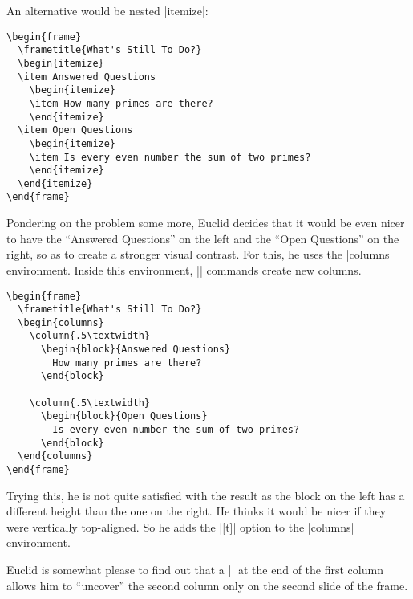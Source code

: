An alternative would be nested |itemize|:
\begin{verbatim}
\begin{frame}
  \frametitle{What's Still To Do?}
  \begin{itemize}
  \item Answered Questions
    \begin{itemize}
    \item How many primes are there?
    \end{itemize}
  \item Open Questions
    \begin{itemize}
    \item Is every even number the sum of two primes?
    \end{itemize}
  \end{itemize}
\end{frame}
\end{verbatim}
Pondering on the problem some more, Euclid decides that it would be
even nicer to have the ``Answered Questions'' on the left and the
``Open Questions'' on the right, so as to create a stronger visual
contrast. For this, he uses the |columns| environment. Inside this
environment, |\column| commands create new columns.
\begin{verbatim}
\begin{frame}
  \frametitle{What's Still To Do?}
  \begin{columns}
    \column{.5\textwidth}
      \begin{block}{Answered Questions}
        How many primes are there?
      \end{block}

    \column{.5\textwidth}
      \begin{block}{Open Questions}
        Is every even number the sum of two primes?
      \end{block}
  \end{columns}
\end{frame}
\end{verbatim}
Trying this, he is not quite satisfied with the result as the block on
the left has a different height than the one on the right. He thinks it
would be nicer if they were vertically top-aligned. So he adds the
|[t]| option to the |columns| environment. 

Euclid is somewhat please to find out that a |\pause| at the end of
the first column allows him to ``uncover'' the second column only on
the second slide of the frame.



